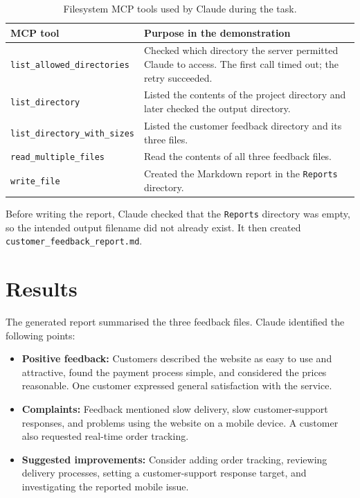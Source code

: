 \documentclass[12pt,a4paper]{article}
\begin{document}
	\begin{table}[H]
		\centering
		\small
		\begin{tabular}{p{}p{}}
			\toprule
			\textbf{MCP tool} & \textbf{Purpose in the demonstration} \\
			\midrule
			\texttt{list\_allowed\_directories} & Checked which directory the server permitted Claude to access. The first call timed out; the retry succeeded. \\
			\texttt{list\_directory} & Listed the contents of the project directory and later checked the output directory. \\
			\texttt{list\_directory\_with\_sizes} & Listed the customer feedback directory and its three files. \\
			\texttt{read\_multiple\_files} & Read the contents of all three feedback files. \\
			\texttt{write\_file} & Created the Markdown report in the \texttt{Reports} directory. \\
			\bottomrule
		\end{tabular}
		\caption{Filesystem MCP tools used by Claude during the task.}
	\end{table}
	
	Before writing the report, Claude checked that the \texttt{Reports} directory was empty, so the intended output filename did not already exist. It then created \texttt{customer\_feedback\_report.md}.
	
	\section{Results}
	
	The generated report summarised the three feedback files. Claude identified the following points:
	
	\begin{itemize}
		\item \textbf{Positive feedback:} Customers described the website as easy to use and attractive, found the payment process simple, and considered the prices reasonable. One customer expressed general satisfaction with the service.
		\item \textbf{Complaints:} Feedback mentioned slow delivery, slow customer-support responses, and problems using the website on a mobile device. A customer also requested real-time order tracking.
		\item \textbf{Suggested improvements:} Consider adding order tracking, reviewing delivery processes, setting a customer-support response target, and investigating the reported mobile issue.
	\end{itemize}
	
\end{document}
